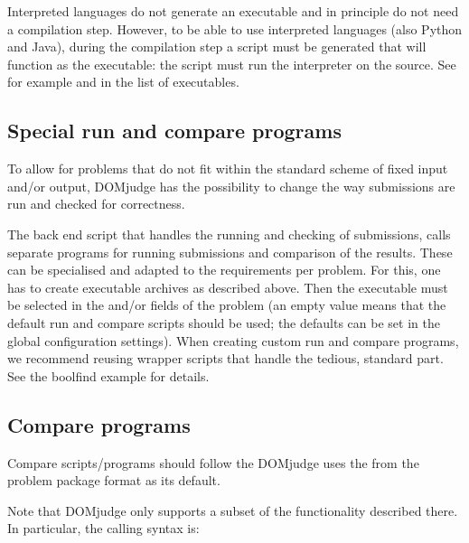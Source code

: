 \documentclass[a4paper,10pt,english,openany]{sphinxmanual}
\begin{document}
\sphinxAtStartPar
Interpreted languages do not generate an executable and in principle
do not need a compilation step. However, to be able to use interpreted
languages (also Python and Java), during the compilation step a script
must be generated that will function as the executable: the script
must run the interpreter on the source. See for example 
and  in the list of executables.


\subsection{Special run and compare programs}
\label{\detokenize{config-advanced:special-run-and-compare-programs}}
\sphinxAtStartPar
To allow for problems that do not fit within the standard scheme of
fixed input and/or output, DOMjudge has the possibility to change the
way submissions are run and checked for correctness.

\sphinxAtStartPar
The back end script  that handles
the running and checking of submissions, calls separate programs
for running submissions and comparison of the results. These can be
specialised and adapted to the requirements per problem. For this, one
has to create executable archives as described above.
Then the executable must be
selected in the  and/or 
fields of the problem (an empty value means that the default run and
compare scripts should be used; the defaults can be set in the global
configuration settings). When creating custom run and compare
programs, we recommend reusing wrapper scripts that handle the
tedious, standard part. See the boolfind example for details.


\subsection{Compare programs}
\label{\detokenize{config-advanced:compare-programs}}
\sphinxAtStartPar
Compare scripts/programs should follow the 
DOMjudge uses the  from the problem package
format as its default.

\sphinxAtStartPar
Note that DOMjudge only supports a subset of the functionality
described there. In particular, the calling syntax is:
\end{document}
